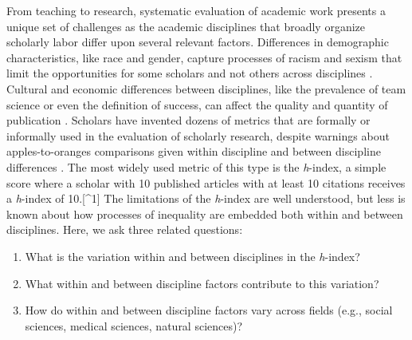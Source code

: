 \documentclass[
  10pt,
  letterpaper,
]{article}
\providecommand{\tightlist}{%
  \setlength{\itemsep}{0pt}\setlength{\parskip}{0pt}}\usepackage{longtable,booktabs,array}
\begin{document}
From teaching to research, systematic evaluation of academic work
presents a unique set of challenges as the academic disciplines that
broadly organize scholarly labor differ upon several relevant factors.
Differences in demographic characteristics, like race and gender,
capture processes of racism and sexism that limit the opportunities for
some scholars and not others across disciplines
\citep{hofstra_diversity_2020, lariviere_bibliometrics_2013, xie_sex_1998}.
Cultural and economic differences between disciplines, like the
prevalence of team science or even the definition of success, can affect
the quality and quantity of publication
\citep{fortunato_science_2018, gardner_conceptualizing_2009, stephan_how_2012}.
Scholars have invented dozens of metrics that are formally or informally
used in the evaluation of scholarly research, despite warnings about
apples-to-oranges comparisons given within discipline and between
discipline differences
\citep{hicks_bibliometrics_2015, ioannidis_standardized_2019}. The most
widely used metric of this type is the \emph{h}-index, a simple score
where a scholar with 10 published articles with at least 10 citations
receives a \emph{h}-index of 10.{[}\^{}1{]} The limitations of the
\emph{h}-index are well understood, but less is known about how
processes of inequality are embedded both within and between
disciplines. Here, we ask three related questions:

\begin{enumerate}
\def\labelenumi{\arabic{enumi}.}
\tightlist
\item
  What is the variation within and between disciplines in the
  \emph{h}-index?
\item
  What within and between discipline factors contribute to this
  variation?
\item
  How do within and between discipline factors vary across fields (e.g.,
  social sciences, medical sciences, natural sciences)?
\end{enumerate}
\end{document}
